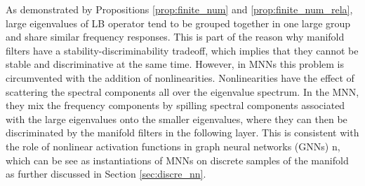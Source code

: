 As demonstrated by Propositions \ref{prop:finite_num} and \ref{prop:finite_num_rela}, large eigenvalues of LB operator tend to be grouped together in one large group and share similar frequency responses. This is part of the reason why manifold filters have a stability-discriminability tradeoff, which implies that they cannot be stable and discriminative at the same time. However, in MNNs this problem is circumvented with the addition of nonlinearities. Nonlinearities have the effect of scattering the spectral components all over the eigenvalue spectrum. In the MNN, they mix the frequency components by spilling spectral components associated with the large eigenvalues onto the smaller eigenvalues, where they can then be discriminated by the manifold filters in the following layer. This is consistent with the role of nonlinear activation functions in graph neural networks (GNNs) n\cite{gama2020stability}, which can be see as instantiations of MNNs on discrete samples of the manifold as further discussed in Section \ref{sec:discre_nn}.

